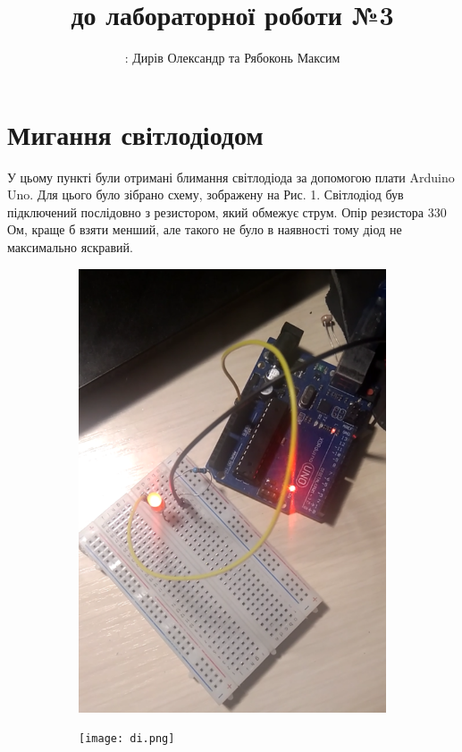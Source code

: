 \documentclass[a4paper,12pt]{article}
\begin{document}
\title{ до лабораторної роботи №3\linebreak }
\author{: Дирів Олександр та Рябоконь Максим}
\date{}
\maketitle
\newpage
{\Large\tableofcontents}
\newpage
\section{Мигання світлодіодом}
\quad У цьому пункті були отримані блимання світлодіода за допомогою плати Arduino Uno. Для цього було зібрано схему, зображену на Рис. 1. Світлодіод був підключений послідовно з резистором, який обмежує струм. Опір резистора 330 Ом, краще б взяти менший, але такого не було в наявності тому діод не максимально яскравий.
\par\quad\begin{figure}[!h]
  \centering
 \begin{subfigure}[b]{0.6\linewidth}
    \includegraphics[width=\linewidth]{diode.PNG}
  \end{subfigure}
  \caption{}
\end{figure}
\par\quad\begin{figure}[!h]
  \centering
 \begin{subfigure}[b]{1\linewidth}
    \texttt{[image: di.png]}
  \end{subfigure}
  \caption{}
\end{figure}
\clearpage
\end{document}
